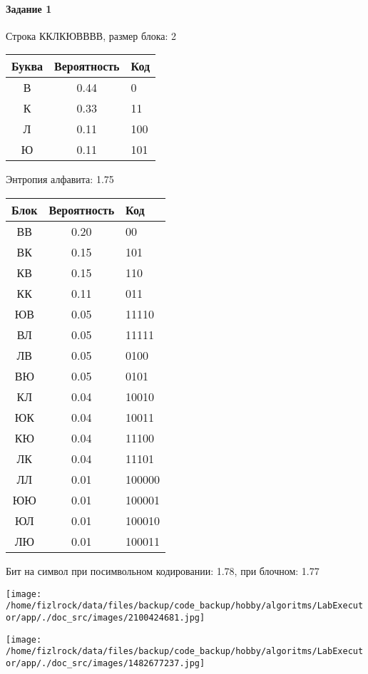 \documentclass[a4paper, 12pt]{article}
\begin{document}
\paragraph{Задание 1}

Строка ККЛКЮВВВВ, размер блока: 2
\begin{center}
 \begin{tabular}{ |c|c|l| } 
  \hline
     Буква & Вероятность & Код\\ \hline
В & 0.44 & 0\\\hline
К & 0.33 & 11\\\hline
Л & 0.11 & 100\\\hline
Ю & 0.11 & 101
\\ \hline \end{tabular}
\end{center}
Энтропия алфавита: 1.75
\begin{center}
 \begin{tabular}{ |c|c|l| } 
  \hline
     Блок & Вероятность & Код\\ \hline
ВВ & 0.20 & 00\\\hline
ВК & 0.15 & 101\\\hline
КВ & 0.15 & 110\\\hline
КК & 0.11 & 011\\\hline
ЮВ & 0.05 & 11110\\\hline
ВЛ & 0.05 & 11111\\\hline
ЛВ & 0.05 & 0100\\\hline
ВЮ & 0.05 & 0101\\\hline
КЛ & 0.04 & 10010\\\hline
ЮК & 0.04 & 10011\\\hline
КЮ & 0.04 & 11100\\\hline
ЛК & 0.04 & 11101\\\hline
ЛЛ & 0.01 & 100000\\\hline
ЮЮ & 0.01 & 100001\\\hline
ЮЛ & 0.01 & 100010\\\hline
ЛЮ & 0.01 & 100011
\\ \hline \end{tabular}
\end{center}
Бит на символ при посимвольном кодировании: 1.78, при блочном: 1.77

\texttt{[image: /home/fizlrock/data/files/backup/code\_backup/hobby/algoritms/LabExecutor/app/./doc\_src/images/2100424681.jpg]}

\texttt{[image: /home/fizlrock/data/files/backup/code\_backup/hobby/algoritms/LabExecutor/app/./doc\_src/images/1482677237.jpg]}
\pagebreak
\end{document}
